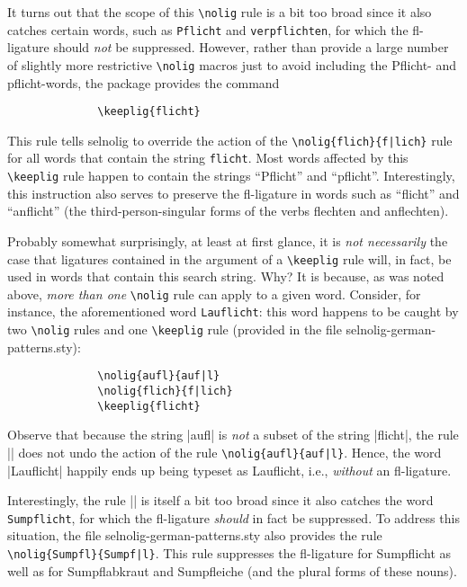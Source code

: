 \documentclass[11pt]{article}
\newcommand{\pkg}[1]{\textsf{#1}}
\newcommand{\opt}[1]{\texttt{#1}}
\newcommand{\cmmd}[1]{\texttt{\textbackslash #1}}
\begin{document}
It turns out that the scope of this \cmmd{nolig} rule is a bit too broad since it also catches certain words, such as \opt{Pflicht} and \opt{verpflichten}, for which the fl-ligature should \emph{not} be suppressed. However, rather than provide a large number of slightly more restrictive \cmmd{nolig} macros just to avoid including the Pflicht- and pflicht-words, the package provides the command
\begin{Verbatim}
              \keeplig{flicht}
\end{Verbatim}
This rule tells \pkg{selnolig} to override the action of the \Verb+\nolig{flich}{f|lich}+ rule for all words that contain the string \opt{flicht}. Most words affected by this \cmmd{keeplig} rule happen to contain the strings \enquote{Pflicht} and \enquote{pflicht}. Interestingly, this instruction also serves to preserve the fl-ligature in words such as \enquote{flicht} and \enquote{anflicht} (the third-person-singular forms of the verbs flechten and anflechten). 

Probably somewhat surprisingly, at least at first glance, it is \emph{not necessarily} the case that ligatures contained in the argument of a \cmmd{keeplig} rule will, in fact, be used in words that contain this search string. Why? It is because, as was noted above, \emph{more than one} \cmmd{nolig} rule can apply to a given word. Consider, for instance, the aforementioned word \opt{Lauflicht}: this word happens to be caught by two \cmmd{nolig} rules and one \cmmd{keeplig} rule (provided in the file \pkg{selnolig-german-patterns.sty}):
\begin{Verbatim}
              \nolig{aufl}{auf|l}
              \nolig{flich}{f|lich}
              \keeplig{flicht}
\end{Verbatim}
Observe that because the string |aufl| is \emph{not} a subset of the string |flicht|, the rule || does not undo the action of the rule \Verb+\nolig{aufl}{auf|l}+. Hence, the word |Lauflicht| happily ends up being typeset as Lauflicht, i.e., \emph{without} an fl-ligature. 

Interestingly, the rule || is itself a bit too broad since it also catches the word \opt{Sumpf\-licht}, for which the fl-ligature \emph{should} in fact be suppressed. To address this situation, the file \pkg{selnolig-german-patterns.sty} also provides the rule 
\Verb+\nolig{Sumpfl}{Sumpf|l}+. This rule suppresses the fl-ligature for Sumpflicht as well as for Sumpflabkraut and Sumpfleiche (and the plural forms of these nouns).
\end{document}
